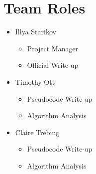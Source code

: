 \documentclass{article}
\begin{document}
\section{Team Roles}
\begin{itemize}
    \item Illya Starikov
    \begin{itemize}
        \item Project Manager
        \item Official Write-up
    \end{itemize}
    \item Timothy Ott
    \begin{itemize}
        \item Pseudocode Write-up
        \item Algorithm Analysis
    \end{itemize}
    \item Claire Trebing
    \begin{itemize}
        \item Pseudocode Write-up
        \item Algorithm Analysis
    \end{itemize}

\end{itemize}
\end{document}
